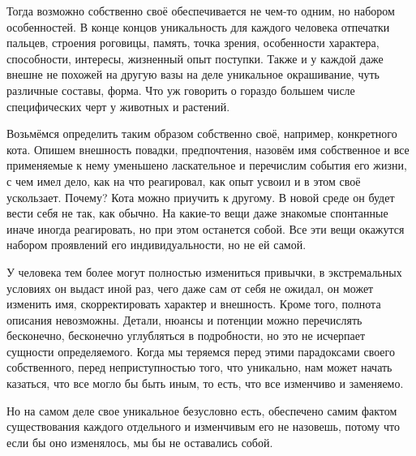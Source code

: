 Тогда возможно
собственно своё обеспечивается не чем-то одним, но набором особенностей. В конце
концов уникальность для каждого человека отпечатки пальцев, строения роговицы,
память, точка зрения, особенности характера, способности, интересы, жизненный
опыт поступки. Также и у каждой даже внешне не похожей на другую вазы на деле
уникальное окрашивание, чуть различные составы, форма. Что уж говорить о гораздо большем числе специфических черт у
животных и растений. 

Возьмёмся определить таким образом собственно своё,
например, конкретного кота. Опишем внешность повадки, предпочтения, назовём имя
собственное и все применяемые к нему уменьшено ласкательное и перечислим события
его жизни, с чем имел дело, как на что реагировал, как опыт усвоил и в этом своё
ускользает. Почему? Кота можно приучить к другому. В новой среде он будет вести
себя не так, как обычно. На какие-то вещи даже знакомые спонтанные иначе иногда
реагировать, но при этом останется собой. Все эти вещи окажутся набором
проявлений его индивидуальности, но не ей самой. 

У человека тем более могут
полностью измениться привычки, в экстремальных условиях он выдаст иной раз, чего
даже сам от себя не ожидал, он может изменить имя, скорректировать характер и
внешность. Кроме того, полнота описания невозможны. Детали, нюансы и потенции
можно перечислять бесконечно, бесконечно углубляться в подробности, но это не
исчерпает сущности определяемого. Когда мы теряемся перед этими парадоксами
своего собственного, перед неприступностью того, что уникально, нам может начать
казаться, что все могло бы быть иным, то есть, что все изменчиво и заменяемо. 

Но
на самом деле свое уникальное безусловно есть, обеспечено самим фактом
существования каждого отдельного и изменчивым его не назовешь, потому что если
бы оно изменялось, мы бы не оставались собой. 


